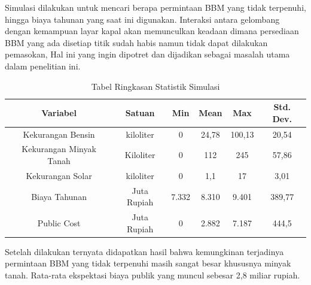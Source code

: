 Simulasi dilakukan untuk mencari berapa permintaan BBM yang tidak terpenuhi, hingga biaya tahunan yang saat ini digunakan. Interaksi antara gelombang dengan kemampuan layar kapal akan memunculkan keadaan dimana persediaan BBM yang ada disetiap titik sudah habis namun tidak dapat dilakukan pemasokan, Hal ini yang ingin dipotret dan dijadikan sebagai masalah utama dalam penelitian ini.

\begin{table}[!ht]
    \centering
    \label{table:summary-stat-existing}
    \caption{Tabel Ringkasan Statistik Simulasi}
    \begin{tabular}{|c|c|c|c|c|c|}
    \hline
    \rowcolor[HTML]{F5AA2D} 
    Variabel                  & Satuan        & Min   & Mean  & Max    & Std.   Dev. \\ \hline
    Kekurangan   Bensin       & kiloliter     & 0     & 24,78 & 100,13 & 20,54       \\ \hline
    Kekurangan   Minyak Tanah & Kiloliter     & 0     & 112   & 245    & 57,86       \\ \hline
    Kekurangan   Solar        & kiloliter     & 0     & 1,1   & 17     & 3,01        \\ \hline
    Biaya   Tahunan           & Juta   Rupiah & 7.332 & 8.310 & 9.401  & 389,77      \\ \hline
    Public   Cost             & Juta   Rupiah & 0     & 2.882 & 7.187  & 444,5       \\ \hline
    \end{tabular}
\end{table}

Setelah dilakukan ternyata didapatkan hasil bahwa kemungkinan terjadinya permintaan BBM yang tidak terpenuhi masih sangat besar khususnya minyak tanah. Rata-rata ekspektasi biaya publik yang muncul sebesar 2,8 miliar rupiah.